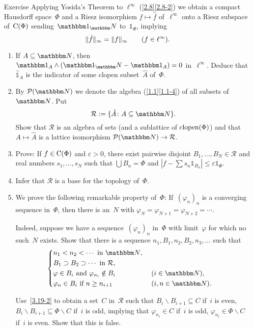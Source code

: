 \documentclass[main.tex]{subfiles}
\begin{document}
\begin{psec}{3.19}{Exercise}
Applying Yosida's Theorem to $\ell^\infty$ (\ref{2.8}\ref{2.8-2})
we obtain a compact Hausdorff space~$\Phi$
and a Riesz isomorphism $f\mapsto \hat{f}$
of~$\ell^\infty$ onto a Riesz subspace of~$\mathrm{C}(\Phi)$
sending~$\mathbb{1}_\N$ to~$\mathbb{1}_\Phi$,
implying
\begin{equation*}
\|\hat{f}\|_\infty = \|f\|_\infty \qquad (f\in \ell^\infty)\text{.}
\end{equation*}
\begin{enumerate}
\item \label{3.19-1}
If $A\subseteq \N$,
then $\mathbb{1}_A \wedge (\mathbb{1}_\N - \mathbb{1}_A)=0$
in~$\ell^\infty$.
Deduce that~$\hat{\mathbb{1}}_A$ is the indicator
of some clopen subset~$\hat{A}$ of~$\Phi$.
%
\item \label{3.19-2}
By $\mathcal{P}(\N)$ we denote the algebra (\ref{1.1}\ref{1.1-4})
of all subsets of~$\N$.
Put
\begin{equation*}
\mathcal{R}:=\{ \hat{A}\colon A \subseteq \N \}\htam{.}
\end{equation*}
Show that $\mathcal{R}$ is an algebra of sets
(and a sublattice of $\mathrm{clopen}(\Phi)$)
and that $A\mapsto \hat{A}$
is a lattice isomorphism $\mathcal{P}(\N)\ra \mathcal{R}$.
%
\item \label{3.19-3}
Prove: If $f\in\mathrm{C}(\Phi)$ and $\varepsilon>0$,
there exist pairwise disjoint $B_1,\dotsc,B_N\in\mathcal{R}$
and real numbers $s_1,\dotsc,s_N$
such that $\bigcup B_n = \Phi$
and $| f- \sum s_n \mathbb{1}_{B_n}| \leq \varepsilon \mathbb{1}_\Phi$.
%
\item \label{3.19-4}
Infer that $\mathcal{R}$ is a base for the topology of~$\Phi$.
%
\item \label{3.19-5}
We prove the following remarkable property of~$\Phi$:
If~$(\varphi_n)_n$ is a converging sequence in~$\Phi$,
then there is an~$N$ with $\varphi_N=\varphi_{N+1}=\varphi_{N+2}=\dotsb$.

Indeed,
suppose we have a sequence~$(\varphi_n)_n$ in~$\Phi$
with limit~$\varphi$
for which no such~$N$ exists.
Show that there is a sequence 
$n_1,B_1,n_2,B_2,n_3,\dotsc$ 
such that
\begin{equation*}
\left\{
\begin{aligned}
&n_1 < n_2 < \dotsb\htam{ in }\N\htam{, } \\
&B_1\supset B_2 \supset \dotsb\htam{ in }\mathcal{R}\htam{,} \\
&\varphi\in B_i\htam{ and } \varphi_{n_i} \notin B_i \quad 
    &&(i\in \N)\htam{,} \\
&\varphi_n\in B_i\htam{ if }n\geq n_{i+1} 
    && (i,n\in \N)\htam{.}
\end{aligned}
\right. 
\end{equation*}

Use~\ref{3.19-2} to obtain a set~$C$ in~$\mathcal{R}$
such that $B_i \backslash B_{i+1}\subseteq C$
if~$i$ is even,
$B_i \backslash B_{i+1} \subseteq \Phi\backslash C$
if~$i$ is odd, 
implying that $\varphi_{n_i}\in C$
if~$i$ is odd,
$\varphi_{n_i}\in\Phi\backslash C$
if~$i$ is even.
Show that this is false.
\end{enumerate}
\end{psec}
\end{document}
